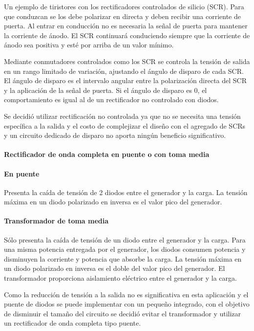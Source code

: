 Un ejemplo de tiristores con los rectificadores controlados de silicio (SCR).
Para que conduzcan se los debe polarizar en directa y deben recibir una corriente de puerta. 
Al entrar en conducción no es necesaria la señal de puerta para mantener la corriente de ánodo. 
El SCR continuará conduciendo siempre que la corriente de ánodo sea positiva y esté por arriba de un valor mínimo. 

Mediante conmutadores controlados como los SCR se controla la tensión de salida en un rango limitado de variación, ajustando el ángulo de disparo de cada SCR. 
El ángulo de disparo es el intervalo angular entre la polarización directa del SCR y la aplicación de la señal de puerta. 
Si el ángulo de disparo es 0, el comportamiento es igual al de un rectificador no controlado con diodos. 

Se decidió utilizar rectificación no controlada ya que no se necesita una tensión específica a la salida
y el costo de complejizar el diseño con el agregado de SCRs y un circuito dedicado de disparo no aporta ningún beneficio significativo.

\paragraph{Rectificador de onda completa en puente o con toma media}

\paragraph{En puente}

Presenta la caída de tensión de 2 diodos entre el generador y la carga. 
La tensión máxima en un diodo polarizado en inversa es el valor pico del generador.

\paragraph{Transformador de toma media}

Sólo presenta la caída de tensión de un diodo entre el generador y la carga. 
Para una misma potencia entregada por el generador,
los diodos consumen potencia y disminuyen la corriente y potencia que absorbe la carga. 
La tensión máxima en un diodo polarizado en inversa es el doble del valor pico del generador.
El transformador proporciona aislamiento eléctrico entre el generador y la carga. 

Como la reducción de tensión a la salida no es significativa en esta aplicación
y el puente de diodos se puede implementar con un pequeño integrado,
con el objetivo de disminuir el tamaño del circuito se decidió evitar el transformador
y utilizar un rectificador de onda completa tipo puente.

